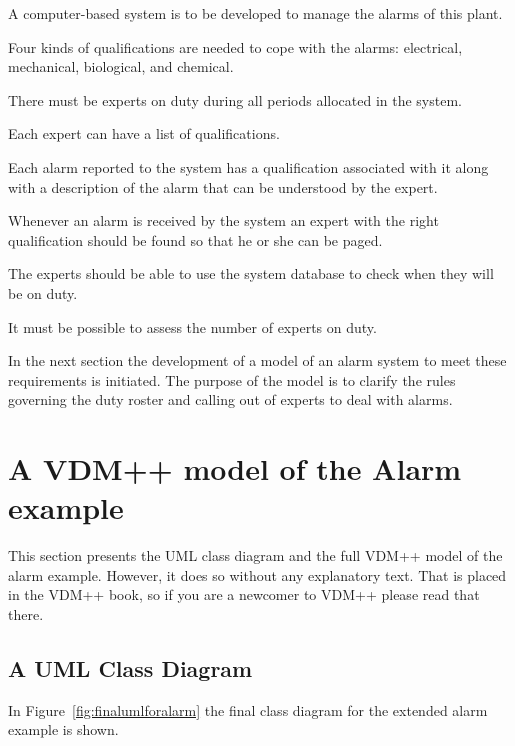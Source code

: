 \begin{reqs}
\item A computer-based system is to be developed to manage the alarms of this plant.
\item Four kinds of qualifications are needed to cope with the alarms: electrical, mechanical, biological, and chemical.
\item There must be experts on duty during all periods allocated in the system.
\item Each expert can have a list of qualifications.
\item Each alarm reported to the system has a qualification associated with it along with a description of the alarm that can be understood by the expert.
\item Whenever an alarm is received by the system an expert with the right qualification should be found so that he or she can be paged.
\item The experts should be able to use the system database to check when they will be on duty.
\item It must be possible to assess the number of experts on duty.
\end{reqs}

In the next section the development of a model of an alarm system to meet these requirements is initiated. The purpose of the model is to clarify the rules governing the duty roster and calling out of experts to deal with alarms.
%
\section{A VDM++ model of the Alarm example}\label{sec:VDMModel}
This section presents the UML class diagram and the full VDM++ model of the alarm example. However, it does so without any explanatory text. That is placed in the VDM++ book, so if you are a newcomer to VDM++ please read that there.
%
\subsection{A UML Class Diagram}
In Figure~\ref{fig:finalumlforalarm} the final class diagram for the extended alarm example is shown.

